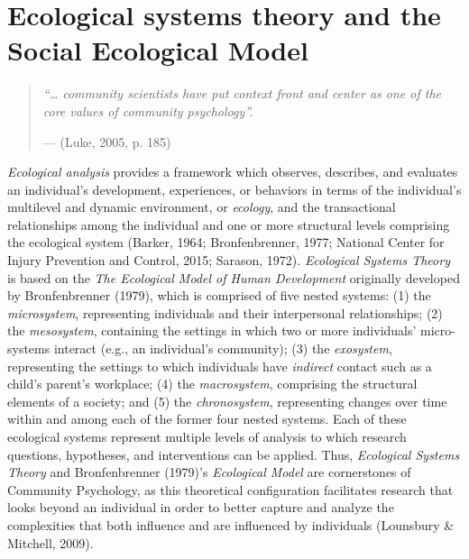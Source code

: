 \documentclass[11pt,]{tufte-book}
\begin{document}
\section{Ecological systems theory and the Social Ecological
Model}\label{ecological-systems-theory-and-the-social-ecological-model}

\begin{quote}
\emph{``\ldots{} community scientists have put context front and center
as one of the core values of community psychology''.}

\hfill --- (Luke, 2005, p. 185)
\end{quote}

\emph{Ecological analysis} provides a framework which observes,
describes, and evaluates an individual's development, experiences, or
behaviors in terms of the individual's multilevel and dynamic
environment, or \emph{ecology}, and the transactional relationships
among the individual and one or more structural levels comprising the
ecological system (Barker, 1964; Bronfenbrenner, 1977; National Center
for Injury Prevention and Control, 2015; Sarason, 1972).
\emph{Ecological Systems Theory} is based on the \emph{The Ecological
Model of Human Development} originally developed by Bronfenbrenner
(1979), which is comprised of five nested systems: (1) the
\emph{microsystem}, representing individuals and their interpersonal
relationships; (2) the \emph{mesosystem}, containing the settings in
which two or more individuals' micro-systems interact (e.g., an
individual's community); (3) the \emph{exosystem}, representing the
settings to which individuals have \emph{indirect} contact such as a
child's parent's workplace; (4) the \emph{macrosystem}, comprising the
structural elements of a society; and (5) the \emph{chronosystem},
representing changes over time within and among each of the former four
nested systems. Each of these ecological systems represent multiple
levels of analysis to which research questions, hypotheses, and
interventions can be applied. Thus, \emph{Ecological Systems Theory} and
Bronfenbrenner (1979)'s \emph{Ecological Model} are cornerstones of
Community Psychology, as this theoretical configuration facilitates
research that looks beyond an individual in order to better capture and
analyze the complexities that both influence and are influenced by
individuals (Lounsbury \& Mitchell, 2009).
\end{document}

